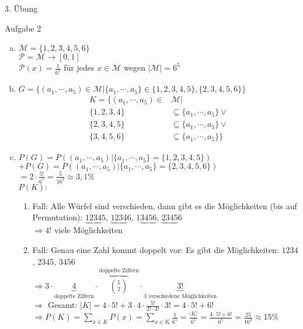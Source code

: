 \begin{section}{3. Übung}
 \begin{subsection}{Aufgabe 2}
 \begin{enumerate}[a)]
  \item $\mathcal{M} = \{1,2,3,4,5,6\}$\\
  $\mathcal{P} = \mathcal{M} \rightarrow [0,1]$\\
  $\mathcal{P}(x) = \frac{1}{6^5}$ für jedes $x \in \mathcal{M}$ wegen $|\mathcal{M}| = 6^5$
  \item $G = \{(a_1, \cdots, a_5)\in \mathcal{M}|\{a_1, \cdots, a_5\}\in\{1,2,3,4,5\},\{2,3,4,5,6\}\}$\\
  \begin{align*}
   K = \{(a_1, \cdots, a_5) \in & \mathcal{M}| \\
   \{1,2,3,4\} & \subseteq \{a_1, \cdots, a_5\} \vee \\
   \{2,3,4,5\} & \subseteq \{a_1, \cdots, a_5\} \vee \\
   \{3,4,5,6\} & \subseteq \{a_1, \cdots, a_5\} \}
  \end{align*}
  \item $P(G) = P((a_1, \cdots, a_5)|\{a_1, \cdots, a_5\} = \{1,2,3,4,5\})$ \\
  $+ P(G) = P((a_1, \cdots, a_5)|\{a_1, \cdots, a_5\} = \{2,3,4,5,6\})$ \\
  $= 2 \cdot \frac{5!}{6^5}  =\frac{5}{16^2} \approx 3,1\%$\\
  $P(K):$
  \begin{enumerate} [1.]
   \item Fall: Alle Würfel sind verschieden, dann gibt es die Möglichkeiten (bis auf Permutation): $\underbrace{1234}5$, $\underbrace{1234}6$, $1\underbrace{3456}$, $\underbrace{2345}6$\\
   $\Rightarrow 4!$ viele Möglichkeiten
   \item Fall: Genau eine Zahl kommt doppelt vor: Es gibt die Möglichkeiten: $1234$, $2345$, $3456$\\
   $\Rightarrow 3 \cdot \underbrace{4}_{\text{doppelte Ziffern}} \cdot \overbrace{\binom{5}{2}}^{\text{doppelte Ziffern}} \cdot\underbrace{3!}_{\text{3 verschiedene Möglichkeiten}}$\\
   $\Rightarrow$ Gesamt: $|K| = 4 \cdot 5! + 3 \cdot 4 \cdot \frac{5!}{2!\cdot3!}\cdot 3! = 4\cdot 5! + 6!$ \\
   $\Rightarrow P(K) = \sum_{x \in K} P(x) = \sum_{x \in K} \frac{1}{6^5} = \frac{|K|}{6^5} = \frac{4 \cdot 5! + 6!}{6^5}  =\frac{25}{16^2} \approx 15\%$\\

\end{enumerate}
\end{enumerate}
\end{subsection}
\end{section}
